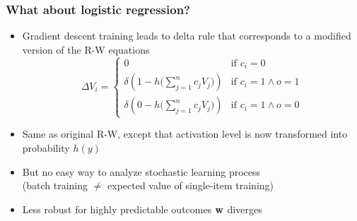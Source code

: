 \begin{frame}
  \frametitle{What about logistic regression?}

  \begin{itemize}
  \item Gradient descent training leads to delta rule that corresponds to a modified version of the R-W equations
    \[
    \Delta V_i =
    \begin{cases}
      0 & \text{if } c_i = 0\\
      \delta \left( 1 - h \bigl( \sum_{j=1}^n c_j V_j \bigr) \right) & \text{if } c_i = 1 \wedge o = 1 \\
      \delta \left( 0 - h \bigl( \sum_{j=1}^n c_j V_j \bigr) \right) & \text{if } c_i = 1 \wedge o = 0
    \end{cases}
    \]
  \item<2-> Same as original R-W, except that activation level is now transformed into probability $h(y)$
  \item<2-> But no easy way to analyze stochastic learning process\\
    (batch training $\neq$ expected value of single-item training)
  \item<2-> Less robust for highly predictable outcomes \so $\vw$ diverges
  \end{itemize}
\end{frame}

